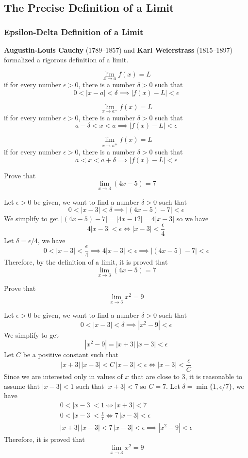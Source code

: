 \subsection{The Precise Definition of a Limit}

\subsubsection{Epsilon-Delta Definition of a Limit}
\textbf{Augustin-Louis Cauchy} (1789--1857) and \textbf{Karl Weierstrass}
(1815--1897) formalized a rigorous definition of a limit.
\begin{definition}
    \[\lim_{x\to a}f(x)=L\] if for every number \(\epsilon>0\), there is a
    number \(\delta>0\) such that \[0<|x-a|<\delta\implies|f(x)-L|<\epsilon\]
\end{definition}
\begin{definition}
    \[\lim_{x\to a^-}f(x)=L\] if for every number \(\epsilon>0\), there is a
    number \(\delta>0\) such that \[a-\delta<x<a\implies|f(x)-L|<\epsilon\]
\end{definition}
\begin{definition}
    \[\lim_{x\to a^+}f(x)=L\] if for every number \(\epsilon>0\), there is a
    number \(\delta>0\) such that \[a<x<a+\delta\implies|f(x)-L|<\epsilon\]
\end{definition}
\begin{problem}
    Prove that \[\lim_{x\to 3}(4x-5)=7\]
\end{problem}
\begin{solution}
    Let \(\epsilon>0\) be given, we want to find a number \(\delta>0\) such
    that \[0<|x-3|<\delta \implies|(4x-5)-7|<\epsilon\]
    We simplify to get \(|(4x-5)-7|=|4x-12|=4|x-3|\) so we have
    \[4|x-3|<\epsilon\iff|x-3|<\frac{\epsilon}{4}\]
    Let \(\delta=\epsilon/4\), we have
    \[0<|x-3|<\frac{\epsilon}{4}\implies4|x-3|<\epsilon\implies
    |(4x-5)-7|<\epsilon\]
    Therefore, by the definition of a limit, it is proved that
    \[\lim_{x\to 3}(4x-5)=7\]
\end{solution}
\begin{problem}
    Prove that \[\lim_{x\to 3}x^2=9\]
\end{problem}
\begin{solution}
    Let \(\epsilon>0\) be given, we want to find a number \(\delta>0\) such
    that \[0<|x-3|<\delta\implies|x^2-9|<\epsilon\]
    We simplify to get \[|x^2-9|=|x+3|\,|x-3|<\epsilon\]
    Let \(C\) be a positive constant such that
    \[|x+3|\,|x-3|<C\,|x-3|<\epsilon \iff |x-3|<\frac{\epsilon}{C}\]
    Since we are interested only in values of \(x\) that are close to 3, it is
    reasonable to assume that \(|x-3|<1\) such that \(|x+3|<7\) so \(C=7\).
    Let \(\delta=\min\{1,\epsilon/7\}\), we have
    \begin{gather*}
        0<|x-3|<1\iff|x+3|<7 \\ 0<|x-3|<\frac{\epsilon}{7}\iff
        7\,|x-3|<\epsilon \\ |x+3|\,|x-3|<7\,|x-3|<\epsilon\implies
        |x^2-9|<\epsilon
    \end{gather*}
    Therefore, it is proved that \[\lim_{x\to 3}x^2=9\]
\end{solution}

